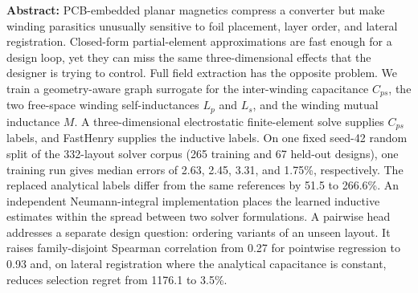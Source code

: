 \documentclass[letterpaper,twocolumn,9pt]{extarticle}
\newcommand{\Cps}{C_{ps}}
\newcommand{\Lp}{L_p}
\newcommand{\Ls}{L_s}
\newcommand{\Mut}{M}
\begin{document}

\noindent{}
\vspace{6pt}

\noindent\textbf{Abstract:} PCB-embedded planar magnetics compress a converter but make winding parasitics unusually sensitive to foil placement, layer order, and lateral registration. Closed-form partial-element approximations are fast enough for a design loop, yet they can miss the same three-dimensional effects that the designer is trying to control. Full field extraction has the opposite problem. We train a geometry-aware graph surrogate for the inter-winding capacitance $\Cps$, the two free-space winding self-inductances $\Lp$ and $\Ls$, and the winding mutual inductance $\Mut$. A three-dimensional electrostatic finite-element solve supplies $\Cps$ labels, and FastHenry supplies the inductive labels. On one fixed seed-42 random split of the 332-layout solver corpus (265 training and 67 held-out designs), one training run gives median errors of 2.63, 2.45, 3.31, and 1.75\%, respectively. The replaced analytical labels differ from the same references by 51.5 to 266.6\%. An independent Neumann-integral implementation places the learned inductive estimates within the spread between two solver formulations. A pairwise head addresses a separate design question: ordering variants of an unseen layout. It raises family-disjoint Spearman correlation from 0.27 for pointwise regression to 0.93 and, on lateral registration where the analytical capacitance is constant, reduces selection regret from 1176.1 to 3.5\%.
\end{document}
